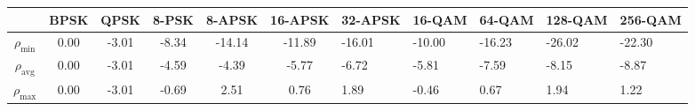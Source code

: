 \begin{tabular}{@{}cccccc@{}}
\toprule
 & BPSK & QPSK & 8-PSK & 8-APSK & 16-APSK & 32-APSK & 16-QAM & 64-QAM & 128-QAM & 256-QAM \\ \midrule
$\rho_\text{min}$ & 0.00 & -3.01 & -8.34 & -14.14 & -11.89 & -16.01 & -10.00 & -16.23 & -26.02 & -22.30 \\ 
$\rho_\text{avg}$ & 0.00 & -3.01 & -4.59 & -4.39 & -5.77 & -6.72 & -5.81 & -7.59 & -8.15 & -8.87 \\ 
$\rho_\text{max}$ & 0.00 & -3.01 & -0.69 & 2.51 & 0.76 & 1.89 & -0.46 & 0.67 & 1.94 & 1.22 \\ 
\bottomrule
\end{tabular}
